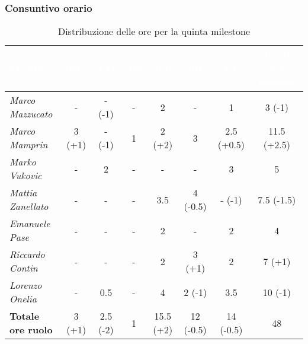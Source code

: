 \subsubsection{Consuntivo orario}
\begin{table}[H]
    \renewcommand\arraystretch{1.5}
    \small
    \centering
    \begin{adjustwidth}{-1.15cm}{}
    \begin{tabular}{|l|c|c|c|c|c|c|c|}
    \hline
            \rowcolor[HTML]{036400}
            \textcolor{white}{\textbf{Membro}} & \multicolumn{1}{c|}{\textcolor{white}{\textbf{RE}}} & \multicolumn{1}{c|}{\textcolor{white}{\textbf{AM}}} & \multicolumn{1}{c|}{\textcolor{white}{\textbf{AN}}} & \multicolumn{1}{c|}{\textcolor{white}{\textbf{PT}}} & \multicolumn{1}{c|}{\textcolor{white}{\textbf{PR}}} & \multicolumn{1}{c|}{\textcolor{white}{\textbf{VE}}} & \multicolumn{1}{c|}{\textcolor{white}{\textbf{Totale ore persona}}} \\ \hline
            \rowcolor[HTML]{EFEFEF}\textit{Marco Mazzucato}  & -            & - (-1)    & -          & 2          & -           & 1             & 3 (-1)        \\ \hline
            \rowcolor[HTML]{C0C0C0}\textit{Marco Mamprin}    & 3 (+1)       & - (-1)    & 1          & 2 (+2)     & 3           & 2.5 (+0.5)    & 11.5 (+2.5)   \\ \hline
            \rowcolor[HTML]{EFEFEF}\textit{Marko Vukovic}    & -            & 2         & -          & -          & -           & 3             & 5             \\ \hline
            \rowcolor[HTML]{C0C0C0}\textit{Mattia Zanellato} & -            & -         & -          & 3.5        & 4 (-0.5)    & - (-1)        & 7.5 (-1.5)    \\ \hline
            \rowcolor[HTML]{EFEFEF}\textit{Emanuele Pase}    & -            & -         & -          & 2          & -           & 2             & 4             \\ \hline
            \rowcolor[HTML]{C0C0C0}\textit{Riccardo Contin}  & -            & -         & -          & 2          & 3 (+1)      & 2             & 7 (+1)        \\ \hline
            \rowcolor[HTML]{EFEFEF}\textit{Lorenzo Onelia}   & -            & 0.5       & -          & 4          & 2 (-1)      & 3.5           & 10 (-1)       \\ \hline
            \rowcolor[HTML]{C0C0C0}\textbf{Totale ore ruolo} & 3 (+1)       & 2.5 (-2)  & 1          & 15.5 (+2)  & 12 (-0.5)   & 14 (-0.5)     & 48            \\ \hline
    \end{tabular}
    \end{adjustwidth}
    \caption{Distribuzione delle ore per la quinta milestone}
\end{table}

